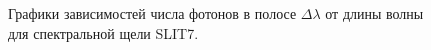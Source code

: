 \documentclass[a4paper]{article}
\begin{document}
\begin{figure}[h]
\begin{minipage}[h]{0.5\linewidth}
\end{minipage}
\begin{minipage}[h]{0.5\linewidth}
\end{minipage}
\begin{minipage}[h]{0.5\linewidth}
\end{minipage}
\caption{Графики зависимостей числа фотонов в полосе $\Delta\lambda$ от длины волны для спектральной щели SLIT7.}
\end{figure}
\clearpage
\end{document}
